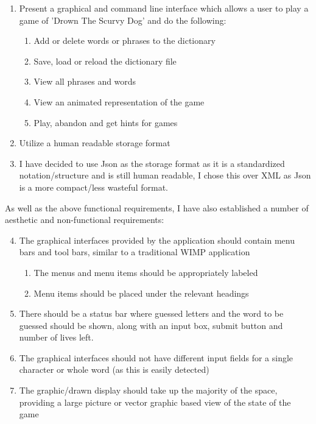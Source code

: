 \documentclass[a4paper, 11pt]{article}
\begin{document}
\begin{enumerate}
\item Present a graphical and command line interface which allows a user to play a game of 'Drown The Scurvy Dog' and do the following:
\begin{enumerate}
\item Add or delete words or phrases to the dictionary
\item Save, load or reload the dictionary file
\item View all phrases and words
\item View an animated representation of the game
\item Play, abandon and get hints for games
\end{enumerate}
\item Utilize a human readable storage format
\item I have decided to use Json as the storage format as it is a standardized notation/structure and is still human readable, I chose this over XML as Json is a more compact/less wasteful format.
\end{enumerate}

As well as the above functional requirements, I have also established a number of aesthetic and non-functional requirements:

\begin{enumerate}
\setcounter{enumi}{3}
\item The graphical interfaces provided by the application should contain menu bars and tool bars, similar to a traditional WIMP application
\begin{enumerate}
\item The menus and menu items should be appropriately labeled
\item Menu items should be placed under the relevant headings
\end{enumerate}
\item There should be a status bar where guessed letters and the word to be guessed should be shown, along with an input box, submit button and number of lives left.
\item The graphical interfaces should not have different input fields for a single character or whole word (as this is easily detected)
\item The graphic/drawn display should take up the majority of the space, providing a large picture or vector graphic based view of the state of the game
\end{enumerate}
\end{document}
